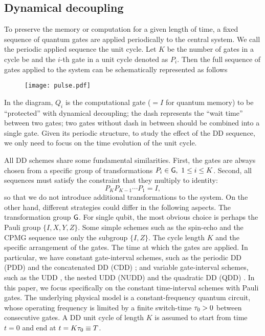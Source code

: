 \documentclass[aps,pra,reprint,superscriptaddress]{revtex4-2}
\newcommand{\numcircled}[1]{\raisebox{.5pt}{\textcircled{\raisebox{-.9pt} {#1}}}}
\begin{document}
\subsection{Dynamical decoupling}

To preserve the memory or computation for a given length of time, a fixed sequence of quantum gates are applied periodically to the central system. 
We call the periodic applied sequence the unit cycle. Let $K$ be the number of gates in a cycle be  and  the $i$-th gate in a unit cycle denoted as $P_i$. Then the full sequence of gates applied to the system can be schematically represented as follows
\begin{figure}[htbp]
 \centering
 \texttt{[image: pulse.pdf]}
 \label{<label>}
\end{figure}

In the diagram, $Q_i$ is the computational gate ($=I$ for quantum memory) to be ``protected'' with dynamical decoupling; the dash represents the ``wait time'' between two gates; two gates without dash in between should be combined into a single gate.
Given its periodic structure, to study the effect of the DD sequence, 
we only need to focus on the time evolution of the unit cycle. 

All DD schemes share some fundamental similarities. First, the gates are always chosen from a specific group of transformations $P_i \in \mathsf{G},\  1\le i\le K$.
Second, all sequences must satisfy the constraint that they multiply to identity:
\begin{equation}\label{eq:fundamental-constraint}
    P_K P_{K-1} \cdots P_1 = I,
\end{equation}
so that we do not introduce additional transformations to the system.
On the other hand, different strategies could differ in 
the following aspects. 
\numcircled{1} The transformation group $\mathsf{G}$. For single qubit, the most obvious choice is perhaps the Pauli group $\{I,X,Y,Z\}$. Some simple schemes such as the spin-echo \cite{Hahn1950} and the CPMG sequence \cite{Carr1954,Meiboom1958} use only the subgroup $\{I,Z\}$.  
\numcircled{2} The cycle length $K$ and the specific arrangement of the gates. 
\numcircled{3} The time at which the gates are applied. In particular, we have  constant gate-interval schemes, such as the periodic DD (PDD) \cite{viola1999dynamical} and the concatenated DD (CDD) \cite{khodjasteh2005fault}; and variable gate-interval schemes, such as the UDD \cite{uhrig2007keeping}, the nested UDD (NUDD) \cite{wang2011protection} and 
the quadratic DD (QDD) \cite{kuo2011quadratic}.
In this paper,  we focus specifically on the constant time-interval schemes with Pauli gates. The underlying physical model is a constant-frequency quantum circuit, whose operating frequency is limited by a finite switch-time  $\tau_0>0$ between consecutive gates. 
A DD unit cycle of length $K$ is assumed to start from time $t=0$ and end at $t=K\tau_0\equiv T$. 
\end{document}

